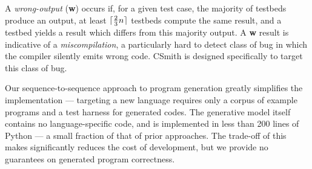 A \emph{wrong-output} (\textbf{w}) occurs if, for a given test case, the majority of testbeds produce an output, at least $\lceil\frac{2}{3}n\rceil$ testbeds compute the same result, and a testbed yields a result which differs from this majority output. A \textbf{w} result is indicative of a \emph{miscompilation}, a particularly hard to detect class of bug in which the compiler silently emits wrong code. CSmith is designed specifically to target this class of bug.



%




Our sequence-to-sequence approach to program generation greatly simplifies the implementation --- targeting a new language requires only a corpus of example programs and a test harness for generated codes. The generative model itself contains no language-specific code, and is implemented in less than 200 lines of Python --- a small fraction of that of prior approaches. The trade-off of this makes significantly reduces the cost of development, but we provide no guarantees on generated program correctness. 


